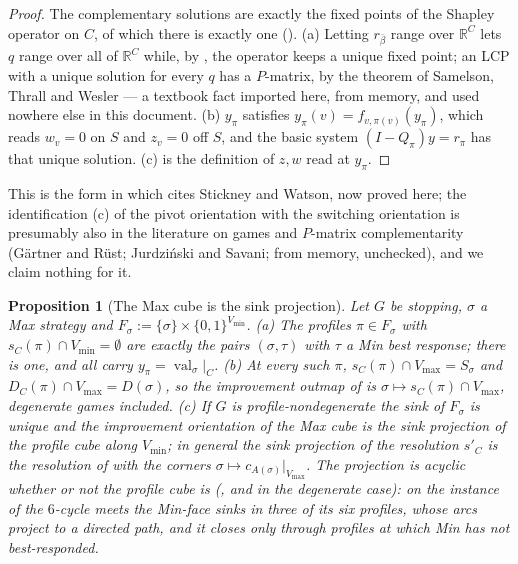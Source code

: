 \documentclass[11pt]{article}
\theoremstyle{plain}
\newtheorem{proposition}[theorem]{Proposition}
\theoremstyle{definition}
\DeclareMathOperator{\val}{val}
\newcommand{\Vmax}{V_{\max}}
\newcommand{\Vmin}{V_{\min}}
\begin{document}
\begin{proof}
The complementary solutions are exactly the fixed points of the Shapley
operator on $C$, of which there is exactly one (). (a)
Letting $r_{\bar\beta}$ range over $\mathbb R^{C}$ lets $q$ range over all
of $\mathbb R^{C}$ while, by , the operator
keeps a unique fixed point; an LCP with a unique solution for every $q$
has a $P$-matrix, by the theorem of Samelson, Thrall and Wesler --- a
textbook fact imported here, from memory, and used nowhere else in this
document. (b) $y_\pi$ satisfies
$y_\pi(v)=f_{v,\pi(v)}(y_\pi)$, which reads $w_v=0$ on $S$ and $z_v=0$
off $S$, and the basic system $(I-Q_\pi)y=r_\pi$ has that unique
solution. (c) is the definition of $z,w$ read at $y_\pi$.
\end{proof}

This is the form in which  cites Stickney and Watson, now
proved here; the identification (c) of the pivot orientation with the
switching orientation is presumably also in the literature on games and
$P$-matrix complementarity (G\"artner and R\"ust; Jurdzi\'nski and
Savani; from memory, unchecked), and we claim nothing for it.

\begin{proposition}[The Max cube is the sink projection]\label{prop:projection}
Let $G$ be stopping, $\sigma$ a Max strategy and
$F_\sigma:=\{\sigma\}\times\{0,1\}^{\Vmin}$. (a) The profiles
$\pi\in F_\sigma$ with $s_C(\pi)\cap\Vmin=\emptyset$ are exactly the pairs
$(\sigma,\tau)$ with $\tau$ a Min best response; there is one, and all
carry $y_\pi=\val_\sigma|_C$. (b) At every such $\pi$,
$s_C(\pi)\cap\Vmax=S_\sigma$ and $D_C(\pi)\cap\Vmax=D(\sigma)$, so the
improvement outmap of  is
$\sigma\mapsto s_C(\pi)\cap\Vmax$, degenerate games included. (c) If $G$
is profile-nondegenerate the sink of $F_\sigma$ is unique and the
improvement orientation of the Max cube is the sink projection of the
profile cube along $\Vmin$; in general the sink projection of the
resolution $s'_C$ is the resolution of  with
the corners $\sigma\mapsto c_{A(\sigma)}|_{\Vmax}$. The projection is
acyclic whether or not the profile cube is (, and
 in the degenerate case): on
the instance of  the $6$-cycle meets the Min-face
sinks in three of its six profiles, whose arcs project to a directed
path, and it closes only through profiles at which Min has not
best-responded.
\end{proposition}
\end{document}
